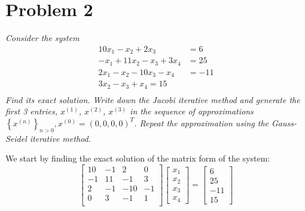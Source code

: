 \section{Problem 2}
\textit{Consider the system}
\begin{align*}
    10x_1 - x_2 + 2x_3 &= 6 \\
    -x_1 + 11x_2 - x_3 + 3x_4 &= 25 \\
    2x_1 - x_2 - 10x_3 - x_4 &= -11 \\
    3x_2 - x_3 + x_4 = 15 \\
\end{align*}
\textit{Find its exact solution. Write down the Jacobi iterative method and generate the first 3 entries, $x^{(1)}$, $x^{(2)}$, $x^{(3)}$ in the sequence of approximations $\left\{ x^{(n)} \right\}_ {n>0}, x^{(0)} = (0,0,0,0)^T$. Repeat the approximation using the Gauss-Seidel iterative method.}

We start by finding the exact solution of the matrix form of the system:
\begin{equation*}
    \begin{bmatrix}
        10 & -1 & 2 & 0 \\
        -1 & 11 & -1 & 3 \\
        2 & -1 & -10 & -1 \\
        0 & 3 & -1 & 1 \\
    \end{bmatrix}
    \begin{bmatrix}
        x_1 \\ x_2 \\ x_3 \\ x_4
    \end{bmatrix}
    = \begin{bmatrix}
        6 \\ 25 \\ -11 \\ 15
    \end{bmatrix}
\end{equation*}

